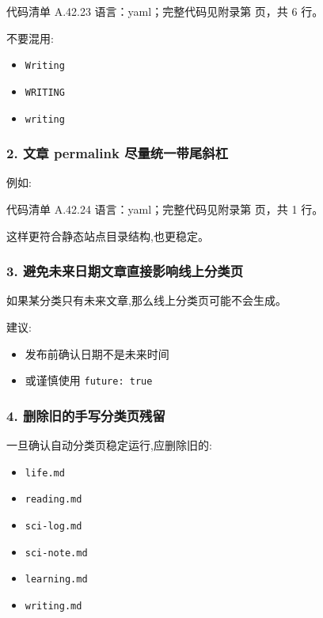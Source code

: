 \documentclass[lang=cn,scheme=chinese,color=blue,device=normal,toc=onecol,math=cm]{elegantbook}
\begin{document}
\begin{codeindexbox}{代码清单 A.42.23}
语言：yaml；完整代码见附录第 \pageref{code:42:23} 页，共 6 行。
\end{codeindexbox}


不要混用:\par


\begin{itemize}
\item \texttt{Writing}
\item \texttt{WRITING}
\item \texttt{writing}
\end{itemize}


\subsubsection{2. 文章 permalink 尽量统一带尾斜杠}


例如:\par


\begin{codeindexbox}{代码清单 A.42.24}
语言：yaml；完整代码见附录第 \pageref{code:42:24} 页，共 1 行。
\end{codeindexbox}


这样更符合静态站点目录结构,也更稳定。\par


\subsubsection{3. 避免未来日期文章直接影响线上分类页}


如果某分类只有未来文章,那么线上分类页可能不会生成。\par


建议:\par


\begin{itemize}
\item 发布前确认日期不是未来时间
\item 或谨慎使用 \texttt{future: true}
\end{itemize}


\subsubsection{4. 删除旧的手写分类页残留}


一旦确认自动分类页稳定运行,应删除旧的:\par


\begin{itemize}
\item \texttt{life.md}
\item \texttt{reading.md}
\item \texttt{sci-log.md}
\item \texttt{sci-note.md}
\item \texttt{learning.md}
\item \texttt{writing.md}
\end{itemize}
\end{document}

